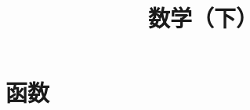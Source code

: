 \documentclass[aspectratio=1610,handout]{ctexbeamer}
\title{数学（下）}
\begin{document}
% 
\part{函数}





\end{document}
